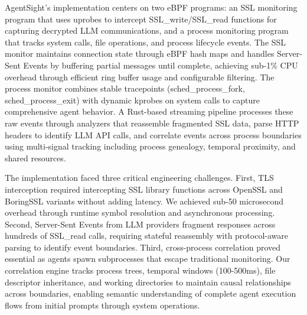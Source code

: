 AgentSight's implementation centers on two eBPF programs: an SSL monitoring program that uses uprobes to intercept SSL\_write/SSL\_read functions for capturing decrypted LLM communications, and a process monitoring program that tracks system calls, file operations, and process lifecycle events. The SSL monitor maintains connection state through eBPF hash maps and handles Server-Sent Events by buffering partial messages until complete, achieving sub-1\% CPU overhead through efficient ring buffer usage and configurable filtering. The process monitor combines stable tracepoints (sched\_process\_fork, sched\_process\_exit) with dynamic kprobes on system calls to capture comprehensive agent behavior. A Rust-based streaming pipeline processes these raw events through analyzers that reassemble fragmented SSL data, parse HTTP headers to identify LLM API calls, and correlate events across process boundaries using multi-signal tracking including process genealogy, temporal proximity, and shared resources.

The implementation faced three critical engineering challenges. First, TLS interception required intercepting SSL library functions across OpenSSL and BoringSSL variants without adding latency. We achieved sub-50 microsecond overhead through runtime symbol resolution and asynchronous processing. Second, Server-Sent Events from LLM providers fragment responses across hundreds of SSL\_read calls, requiring stateful reassembly with protocol-aware parsing to identify event boundaries. Third, cross-process correlation proved essential as agents spawn subprocesses that escape traditional monitoring. Our correlation engine tracks process trees, temporal windows (100-500ms), file descriptor inheritance, and working directories to maintain causal relationships across boundaries, enabling semantic understanding of complete agent execution flows from initial prompts through system operations.